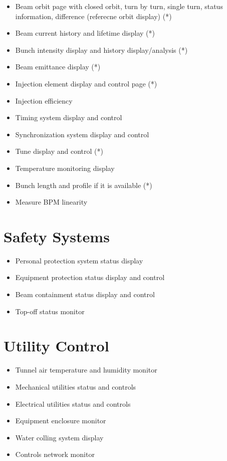 \documentclass[11pt,oneside,letterpaper,showtrims,article]{memoir}
\begin{document}
\begin{itemize}
\item Beam orbit page with closed orbit, turn by turn, single turn, status
  information, difference (referecne orbit display) (*)
\item Beam current history and lifetime display (*)
\item Bunch intensity display and history display/analysis (*)
\item Beam emittance display (*)
\item Injection element display and control page (*)
\item Injection efficiency
\item Timing system display and control 
\item Synchronization system display and control
\item Tune display and control (*)
\item Temperature monitoring display
\item Bunch length and profile if it is available (*)
\item Measure BPM linearity
\end{itemize}

\section{Safety Systems}

\begin{itemize}
\item Personal protection system status display
\item Equipment protection status display and control
\item Beam containment status display and control
\item Top-off status monitor
\end{itemize}

\section{Utility Control}

\begin{itemize}
\item Tunnel air temperature and humidity monitor
\item Mechanical utilities status and controls
\item Electrical utilities status and controls
\item Equipment enclosure monitor
\item Water colling system display
\item Controls network monitor
\end{itemize}
\end{document}
